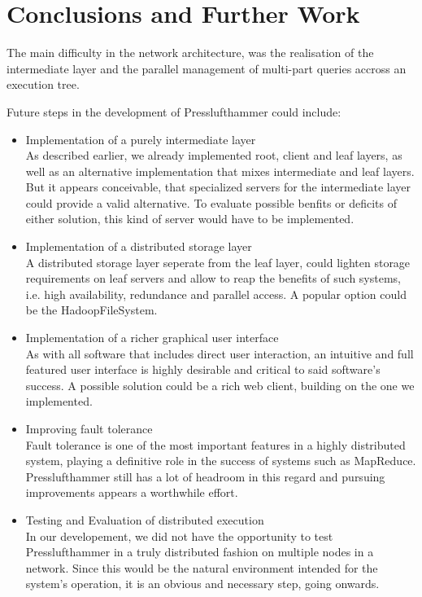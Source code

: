 \section{Conclusions and Further Work}
  The main difficulty in the network architecture, was the realisation of
  the intermediate layer and the parallel management of multi-part queries
  accross an execution tree.

  Future steps in the development of Presslufthammer could include:
  \begin{itemize}
    \item Implementation of a purely intermediate layer\\
      As described earlier, we already implemented root, client and leaf layers,
      as well as an alternative implementation that mixes intermediate and leaf
      layers. But it appears conceivable, that specialized servers for the
      intermediate layer could provide a valid alternative.
      To evaluate possible benfits or deficits of either solution, this kind of
      server would have to be implemented.
    
    \item Implementation of a distributed storage layer\\
      A distributed storage layer seperate from the leaf layer, could lighten
      storage requirements on leaf servers and allow to reap the benefits of
      such systems, i.e. high availability, redundance and parallel access.
      A popular option could be the HadoopFileSystem.
    
    \item Implementation of a richer graphical user interface\\
      As with all software that includes direct user interaction, an intuitive
      and full featured user interface is highly desirable and critical to 
      said software's success. A possible solution could be a rich web client,
      building on the one we implemented.
    
    \item Improving fault tolerance\\
      Fault tolerance is one of the most important features in a highly
      distributed system, playing a definitive role in the success of systems
      such as MapReduce. Presslufthammer still has a lot of headroom in this
      regard and pursuing improvements appears a worthwhile effort.
    
    \item Testing and Evaluation of distributed execution\\
      In our developement, we did not have the opportunity to test
      Presslufthammer in a truly distributed fashion on multiple nodes in a
      network. Since this would be the natural environment intended for the
      system's operation, it is an obvious and necessary step, going onwards.
    

\end{itemize}
